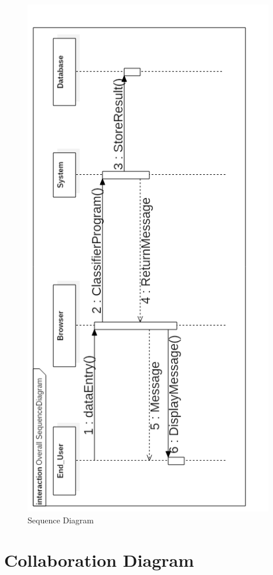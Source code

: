 \begin{figure}[H] %
\begin{center}
	\includegraphics[height = 9in]{images/Sequence.png}
	\caption{Sequence Diagram} %
	\label{Sequence} %
\end{center}
\end{figure}

\newpage
\section{Collaboration Diagram}

